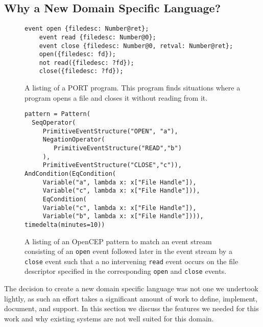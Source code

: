 \subsection{Why a New Domain Specific Language?}
\begin{figure}
  \begin{lstlisting}[gobble=4,xleftmargin=.8em]
    event open {filedesc: Number@ret};
    event read {filedesc: Number@0};
    event close {filedesc: Number@0, retval: Number@ret};
    open({filedesc: fd});
    not read({filedesc: ?fd});
    close({filedesc: ?fd});
  \end{lstlisting}
  \caption{A listing of a PORT program.  This program finds situations
  where a program opens a file and closes it without reading from it.}
  \label{fig:PORTListing}
\end{figure}



\begin{figure}
  \begin{lstlisting}
pattern = Pattern(
  SeqOperator(
     PrimitiveEventStructure("OPEN", "a"),
     NegationOperator(
        PrimitiveEventStructure("READ","b")
     ),
     PrimitiveEventStructure("CLOSE","c")),
AndCondition(EqCondition(
     Variable("a", lambda x: x["File Handle"]),
     Variable("c", lambda x: x["File Handle"])),
     EqCondition(
     Variable("c", lambda x: x["File Handle"]),
     Variable("b", lambda x: x["File Handle"]))),
timedelta(minutes=10))
  \end{lstlisting}
  \caption{
    A listing of an OpenCEP pattern to match an event stream consisting of
    an {\tt open} event followed later in the event stream by a {\tt close}
    event such
    that a no intervening {\tt read} event occurs
    on the file descriptor specified in the corresponding {\tt open}
    and {\tt close} events.
}
  \label{fig:OpenCEPListing}
\end{figure}


The decision to create a new domain specific language was not one we
undertook lightly,
as such an effort takes
a significant amount of work
to define,
implement, document, and support.
In this section we discuss the features we needed for this work
and why existing systems are not well suited for this domain.

